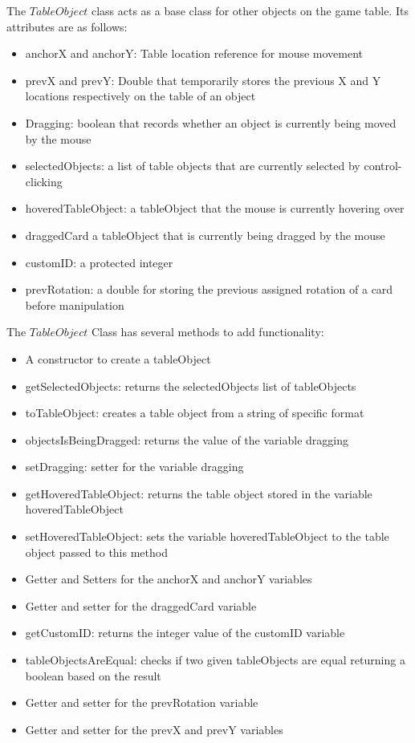 \documentclass[a4paper]{project}
\begin{document}
				The $TableObject$ class acts as a base class for other objects on the game table. Its attributes are as follows:
				
				\begin{itemize}
					\item anchorX and anchorY: Table location reference for mouse movement
					\item prevX and prevY: Double that temporarily stores the previous X and Y locations respectively on the table of an object 
					\item Dragging: boolean that records whether an object is currently being moved by the mouse
					\item selectedObjects: a list of table objects that are currently selected by control-clicking
					\item hoveredTableObject: a tableObject that the mouse is currently hovering over
					\item draggedCard a tableObject that is currently being dragged by the mouse
					\item customID: a protected integer
					\item prevRotation: a double for storing the previous assigned rotation of a card before manipulation
				\end{itemize}
				
				The $TableObject$ Class has several methods to add functionality:
				
				\begin{itemize}
					\item A constructor to create a tableObject
					\item getSelectedObjects: returns the selectedObjects list of tableObjects
					\item toTableObject: creates a table object from a string of specific format
					\item objectsIsBeingDragged: returns the value of the variable dragging
					\item setDragging: setter for the variable dragging
					\item getHoveredTableObject: returns the table object stored in the variable hoveredTableObject
					\item setHoveredTableObject: sets the variable hoveredTableObject to the table object passed to this method
					\item Getter and Setters for the anchorX and anchorY variables
					\item Getter and setter for the draggedCard variable
					\item getCustomID: returns the integer value of the customID variable
					\item tableObjectsAreEqual: checks if two given tableObjects are equal returning a boolean based on the result
					\item Getter and setter for the prevRotation variable
					\item Getter and setter for the prevX and prevY variables
				\end{itemize}
				
\end{document}
